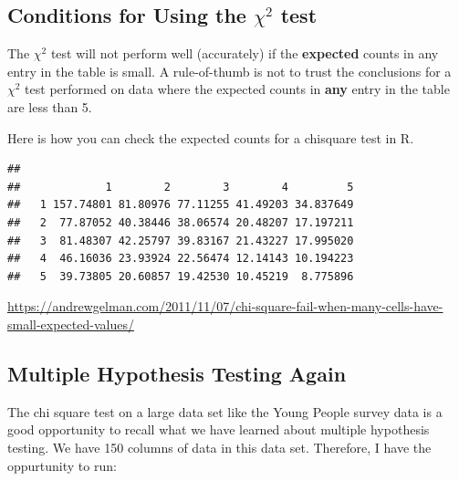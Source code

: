 \documentclass[
]{book}
\newenvironment{Shaded}{\begin{snugshade}}{\end{snugshade}}
\newcommand{\FunctionTok}[1]{\textcolor[rgb]{0.00,0.00,0.00}{#1}}
\newcommand{\NormalTok}[1]{#1}
\newcommand{\OtherTok}[1]{\textcolor[rgb]{0.56,0.35,0.01}{#1}}
\newcommand{\SpecialCharTok}[1]{\textcolor[rgb]{0.00,0.00,0.00}{#1}}
\theoremstyle{definition}
\theoremstyle{definition}
\theoremstyle{definition}
\theoremstyle{definition}
\theoremstyle{remark}
\begin{document}
\hypertarget{conditions-for-using-the-chi2-test}{%
\subsection{\texorpdfstring{Conditions for Using the \(\chi^2\) test}{Conditions for Using the \textbackslash chi\^{}2 test}}\label{conditions-for-using-the-chi2-test}}

The \(\chi^2\) test will not perform well (accurately) if the \textbf{expected} counts in any entry in the table is small. A rule-of-thumb is not to trust the conclusions for a \(\chi^2\) test performed on data where the expected counts in \textbf{any} entry in the table are less than 5.

Here is how you can check the expected counts for a chisquare test in R.

\begin{Shaded}
\end{Shaded}

\begin{verbatim}
##    
##             1        2        3        4         5
##   1 157.74801 81.80976 77.11255 41.49203 34.837649
##   2  77.87052 40.38446 38.06574 20.48207 17.197211
##   3  81.48307 42.25797 39.83167 21.43227 17.995020
##   4  46.16036 23.93924 22.56474 12.14143 10.194223
##   5  39.73805 20.60857 19.42530 10.45219  8.775896
\end{verbatim}

\url{https://andrewgelman.com/2011/11/07/chi-square-fail-when-many-cells-have-small-expected-values/}

\hypertarget{multiple-hypothesis-testing-again}{%
\subsection{Multiple Hypothesis Testing Again}\label{multiple-hypothesis-testing-again}}

The chi square test on a large data set like the Young People survey data is a good opportunity to recall what we have learned about multiple hypothesis testing. We have 150 columns of data in this data set. Therefore, I have the oppurtunity to run:
\end{document}
